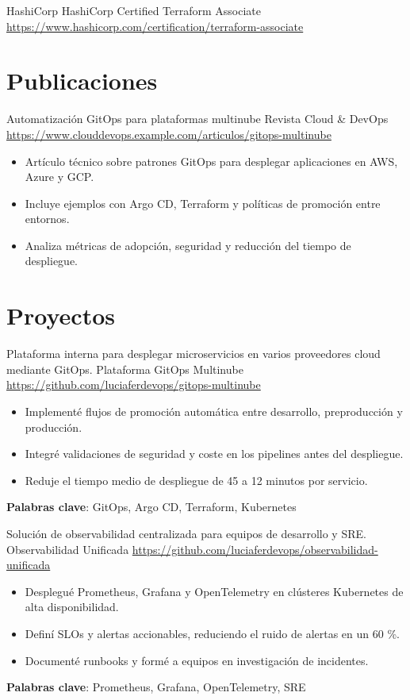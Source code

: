 \documentclass[a4paper, serif, 10pt]{moderncv}
\begin{document}
        {HashiCorp}
        {HashiCorp Certified Terraform Associate}
        {\url{https://www.hashicorp.com/certification/terraform-associate}}
        {}
        {}
\section{Publicaciones}

        {Automatización GitOps para plataformas multinube}
        {Revista Cloud \& DevOps}
        {\url{https://www.clouddevops.example.com/articulos/gitops-multinube}}
        {}
        {\begin{itemize}
\item Artículo técnico sobre patrones GitOps para desplegar aplicaciones en AWS, Azure y GCP.
\item Incluye ejemplos con Argo CD, Terraform y políticas de promoción entre entornos.
\item Analiza métricas de adopción, seguridad y reducción del tiempo de despliegue.
\end{itemize}}
\section{Proyectos}

        {Plataforma interna para desplegar microservicios en varios proveedores cloud mediante GitOps.}
        {Plataforma GitOps Multinube}
        {\url{https://github.com/luciaferdevops/gitops-multinube}}
        {}
        {\begin{itemize}
\item Implementé flujos de promoción automática entre desarrollo, preproducción y producción.
\item Integré validaciones de seguridad y coste en los pipelines antes del despliegue.
\item Reduje el tiempo medio de despliegue de 45 a 12 minutos por servicio.
\end{itemize}
\textbf{Palabras clave}: GitOps, Argo CD, Terraform, Kubernetes}

        {Solución de observabilidad centralizada para equipos de desarrollo y SRE.}
        {Observabilidad Unificada}
        {\url{https://github.com/luciaferdevops/observabilidad-unificada}}
        {}
        {\begin{itemize}
\item Desplegué Prometheus, Grafana y OpenTelemetry en clústeres Kubernetes de alta disponibilidad.
\item Definí SLOs y alertas accionables, reduciendo el ruido de alertas en un 60 \%.
\item Documenté runbooks y formé a equipos en investigación de incidentes.
\end{itemize}
\textbf{Palabras clave}: Prometheus, Grafana, OpenTelemetry, SRE}
\end{document}
